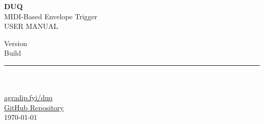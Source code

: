 \documentclass[12pt,a4paper]{report}
\begin{document}
\begin{titlepage}
    \duqbackground
    \centering
    \headerfont
    \vspace*{4.5cm}
    
    {\fontsize{48}{56}\selectfont \bfseries \color{duqblue} DUQ} \\[0.4cm]
    {\Large \color{headercolor} MIDI-Based Envelope Trigger} \\[2.5cm]
    
    {\small {} USER MANUAL} \\[3.5cm]
    
    \vfill
    
    \begin{minipage}{0.5\textwidth}
        \centering
        \small \color{headercolor}
        Version \manualversion \\
        Build \gitcommit \\
        \vspace{0.2cm}
        \rule{\textwidth}{0.4pt}
    \end{minipage} \\[2cm]
    
    {\large \bfseries \authorname} \\[0.3cm]
    {\small \faGlobe} \hspace{0.1cm} {\small \href{\projecturl}{agradip.fyi/duq}} \\[0.2cm]
    {\small \faGithub} \hspace{0.1cm} {\small \href{\githuburl}{GitHub Repository}} \\[1cm]
    
    {\footnotesize \today}
\end{titlepage}

\tableofcontents





























\end{document}
